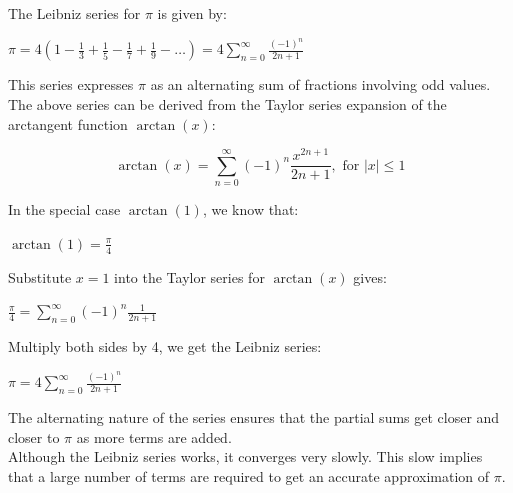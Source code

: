 \documentclass[12pt]{article}
\begin{document}
The Leibniz series for $\pi$ is given by:
\begin{center}
    $\pi = 4 \left(1 - \frac{1}{3} + \frac{1}{5} - \frac{1}{7} + \frac{1}{9} - \ldots\right) = 4
    \sum\limits_{n=0}^\infty \frac{(-1)^n}{2n + 1}$
\end{center}
This series expresses $\pi$ as an alternating sum of fractions involving odd values.\\

\noindent The above series can be derived from the Taylor series expansion of the arctangent function $\arctan(x)$:

\begin{equation}
    \arctan(x) = \sum_{n=0}^\infty (-1)^n\frac{x^{2n+1}}{2n+1}, \text{ for } |x| \leq 1
\end{equation}

\noindent In the special case $\arctan(1)$, we know that:
\begin{center}
    $\arctan(1) = \frac{\pi}{4}$
\end{center}
Substitute $x = 1$ into the Taylor series for $\arctan(x)$ gives:
\begin{center}
    $\frac{\pi}{4} = \sum\limits_{n=0}^\infty (-1)^n \frac{1}{2n+1}$
\end{center}
Multiply both sides by 4, we get the Leibniz series:
\begin{center}
    $\pi = 4\sum\limits_{n=0}^\infty \frac{(-1)^n}{2n+1}$
\end{center}

\noindent The alternating nature of the series ensures that the partial sums get closer and closer to $\pi$ as more terms are added.\\

\noindent Although the Leibniz series works, it converges very slowly. This slow implies that a large number of terms are required to get an accurate approximation of $\pi$.\\
\end{document}
